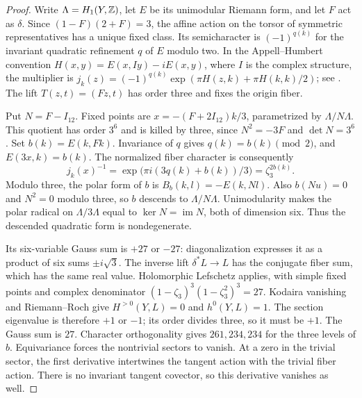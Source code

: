 \begin{proof}
Write $\Lambda=H_1(Y,\mathbb Z)$, let $E$ be its unimodular Riemann form,
and let $F$ act as $\delta$. Since $(1-F)(2+F)=3$, the affine action
on the torsor of symmetric representatives has a unique fixed class.
Its semicharacter is $(-1)^{q(k)}$ for the invariant quadratic
refinement $q$ of $E$ modulo two. In the Appell--Humbert convention
$H(x,y)=E(x,Iy)-iE(x,y)$, where $I$ is the complex structure,
the multiplier is
$j_k(z)=(-1)^{q(k)}\exp(\pi H(z,k)+\pi H(k,k)/2)$;
see \cite[\S1.2, pp.~7--8]{PolishchukTheta}.
The lift $T(z,t)=(Fz,t)$ has order three and fixes the origin fiber.

Put $N=F-I_{12}$. Fixed points are
$x=-(F+2I_{12})k/3$, parametrized by $\Lambda/N\Lambda$.
This quotient has order $3^6$ and is killed by three, since
$N^2=-3F$ and $\det N=3^6$.
Set $b(k)=E(k,Fk)$. Invariance of $q$ gives
$q(k)=b(k)\pmod2$, and $E(3x,k)=b(k)$.
The normalized fiber character is consequently
\[
 j_k(x)^{-1}
 =\exp\bigl(\pi i(3q(k)+b(k))/3\bigr)
 =\zeta_3^{2b(k)}.
\]
Modulo three, the polar form of $b$ is
$B_b(k,l)=-E(k,Nl)$. Also $b(Nu)=0$ and $N^2=0$ modulo
three, so $b$ descends to $\Lambda/N\Lambda$.
Unimodularity makes the polar radical on $\Lambda/3\Lambda$
equal to $\ker N=\operatorname{im}N$, both of dimension six.
Thus the descended quadratic form is nondegenerate.

Its six-variable Gauss sum is $+27$ or $-27$: diagonalization
expresses it as a product of six sums $\pm i\sqrt3$.
The inverse lift $\delta^*L\to L$ has the conjugate fiber sum,
which has the same real value. Holomorphic Lefschetz
\cite[Theorem~4.12]{AtiyahBott1968II} applies, with simple fixed
points and complex denominator
$(1-\zeta_3)^3(1-\zeta_3^2)^3=27$.
Kodaira vanishing and Riemann--Roch give $H^{>0}(Y,L)=0$ and
$h^0(Y,L)=1$. The section eigenvalue is therefore $+1$ or $-1$;
its order divides three, so it must be $+1$. The Gauss sum is $27$.
Character orthogonality gives $261,234,234$ for the three levels
of $b$. Equivariance forces the nontrivial sectors to vanish.
At a zero in the trivial sector, the first derivative intertwines
the tangent action with the trivial fiber action. There is no
invariant tangent covector, so this derivative vanishes as well.
\end{proof}

